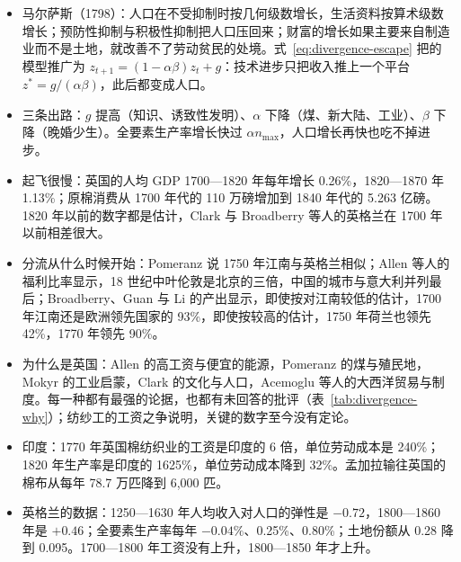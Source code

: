 \begin{takeaways}
\begin{itemize}
\item 马尔萨斯（1798）：人口在不受抑制时按几何级数增长，生活资料按算术级数增长；预防性抑制与积极性抑制把人口压回来；财富的增长如果主要来自制造业而不是土地，就改善不了劳动贫民的处境。式~\eqref{eq:divergence-escape} 把的模型推广为 $z_{t+1}=(1-\alpha\beta)z_t+g$：技术进步只把收入推上一个平台 $z^{*}=g/(\alpha\beta)$，此后都变成人口。
\item 三条出路：$g$ 提高（知识、诱致性发明）、$\alpha$ 下降（煤、新大陆、工业）、$\beta$ 下降（晚婚少生）。全要素生产率增长快过 $\alpha n_{\max}$，人口增长再快也吃不掉进步。
\item 起飞很慢：英国的人均 GDP 1700—1820 年每年增长 0.26\%，1820—1870 年 1.13\%；原棉消费从 1700 年代的 110 万磅增加到 1840 年代的 5.263 亿磅。1820 年以前的数字都是估计，Clark 与 Broadberry 等人的英格兰在 1700 年以前相差很大。
\item 分流从什么时候开始：Pomeranz 说 1750 年江南与英格兰相似；Allen 等人的福利比率显示，18 世纪中叶伦敦是北京的三倍，中国的城市与意大利并列最后；Broadberry、Guan 与 Li 的产出显示，即使按对江南较低的估计，1700 年江南还是欧洲领先国家的 93\%，即使按较高的估计，1750 年荷兰也领先 42\%，1770 年领先 90\%。
\item 为什么是英国：Allen 的高工资与便宜的能源，Pomeranz 的煤与殖民地，Mokyr 的工业启蒙，Clark 的文化与人口，Acemoglu 等人的大西洋贸易与制度。每一种都有最强的论据，也都有未回答的批评（表~\ref{tab:divergence-why}）；纺纱工的工资之争说明，关键的数字至今没有定论。
\item 印度：1770 年英国棉纺织业的工资是印度的 6 倍，单位劳动成本是 240\%；1820 年生产率是印度的 1625\%，单位劳动成本降到 32\%。孟加拉输往英国的棉布从每年 78.7 万匹降到 6,000 匹。
\item 英格兰的数据：1250—1630 年人均收入对人口的弹性是 $-0.72$，1800—1860 年是 $+0.46$；全要素生产率每年 $-0.04\%$、0.25\%、0.80\%；土地份额从 0.28 降到 0.095。1700—1800 年工资没有上升，1800—1850 年才上升。
\end{itemize}
\end{takeaways}


